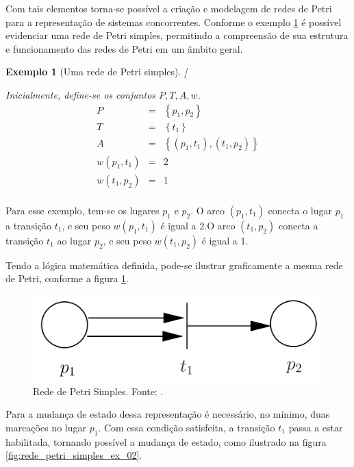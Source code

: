 \documentclass[
	12pt,				%
	openright,			%
	oneside,			%
	a4paper,			%
	english,			%
	brazil				%
	]{abntex2}
\newtheorem{exemplo}{Exemplo}
\begin{document}
Com tais elementos torna-se possível a criação e modelagem de redes de Petri para a representação de sistemas concorrentes. Conforme o exemplo \ref{exemplo_rede_petri_simples} é possível evidenciar uma rede de Petri simples, permitindo a compreensão de sua estrutura e funcionamento das redes de Petri em um âmbito geral.

\begin{exemplo}[Uma rede de Petri simples]
\label{exemplo_rede_petri_simples}]

Inicialmente, define-se os conjuntos $P, T, A, w$. 
\begin{eqnarray*}
P &=& \left \{ p_{1},p_{2}\right \} \\
T &=& \left \{ t_{1}\right \} \\
A &=& \left \{ \left (p_{1},t_{1}\right ),\left (t_{1},p_{2}\right ) \right \} \\
w\left ( p_{1},t_{1} \right ) &=& 2 \\
w\left ( t_{1},p_{2} \right ) &=& 1 \\
\end{eqnarray*}
\end{exemplo}
%
Para esse exemplo, tem-se os lugares $p_{1}$ e $p_{2}$. O arco $\left ( p_{1},t_{1} \right )$ conecta o lugar $p_{1}$ a transição $t_{1}$, e seu peso $w\left ( p_{1},t_{1} \right )$ é igual a 2.O arco $\left ( t_{1},p_{2} \right )$ conecta a transição  $t_{1}$ ao lugar $p_{2}$, e seu peso $w\left ( t_{1},p_{2} \right )$ é igual a 1. 

Tendo a lógica matemática definida, pode-se ilustrar graficamente a mesma rede de Petri, conforme a figura \ref{fig:rede_petri_simples_ex_01}.

\begin{figure}[ht] 
	\centering
	\includegraphics[scale=0.3]{exemplo_simples_rede_petri.png}
	\caption[Rede de Petri Simples]{Rede de Petri Simples. Fonte: \textcite{CassandrasLafortune08}.}
	\label{fig:rede_petri_simples_ex_01}
\end{figure} 

Para a mudança de estado dessa representação é necessário, no mínimo, duas marcações no lugar $p_{1}$. Com essa condição satisfeita, a transição $t_{1}$ passa a estar habilitada, tornando possível a mudança de estado, como ilustrado na figura \ref{fig:rede_petri_simples_ex_02}.
\end{document}
